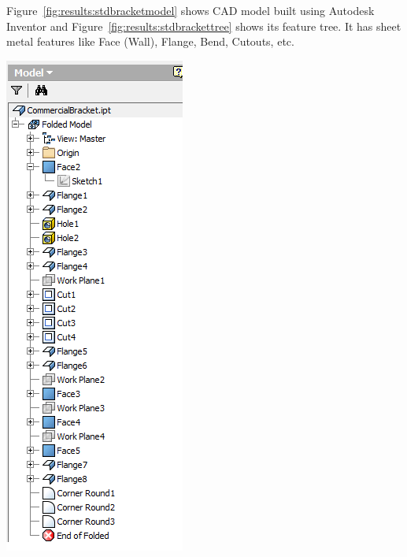 \begin{minipage}{\linewidth}
\begin{minipage}[c]{0.62\linewidth}
Figure~\ref{fig:results:stdbracketmodel} shows CAD model built using Autodesk Inventor and Figure~\ref{fig:results:stdbrackettree} shows its feature tree. It has sheet metal features like Face (Wall), Flange, Bend, Cutouts, etc.
\end{minipage}
\quad
\begin{minipage}[c]{0.3\linewidth}
\includegraphics[width=\linewidth,valign=t]{images/CommercialBracket_tree}
 \label{fig:results:stdbrackettree}
\end{minipage}
\end{minipage}

